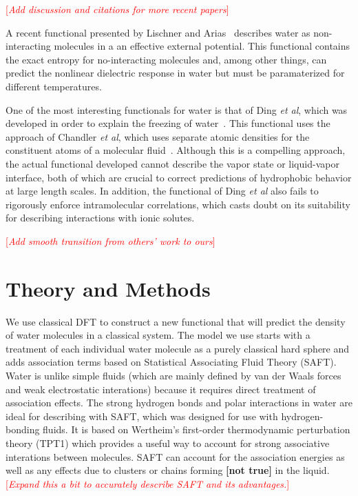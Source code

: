 \documentclass[letterpaper,twocolumn,amsmath,amssymb,prb]{revtex4-1}
\newcommand{\red}[1]{{\bf \color{red} #1}}
\newcommand{\fixme}[1]{\red{[#1]}}
\newcommand{\needsworknow}[1]{\textcolor{red}{[\emph{#1}]}}
\begin{document}
\needsworknow{Add discussion and citations for more recent papers}

A recent functional presented by Lischner and Arias~\cite{lischner2010classical}
describes water as non-interacting molecules in a an
effective external potential.  This functional contains the exact
entropy for no-interacting molecules and, among other things, can 
predict the nonlinear dielectric response in water but must be paramaterized
for different temperatures.

One of the most interesting functionals for water is that of Ding \emph{et
al}, which was developed in order to explain the freezing of
water~\cite{ding1987}.  This functional uses the approach of Chandler
\emph{et al}, which uses separate atomic densities for the constituent
atoms of a molecular fluid~\cite{chandler1986a, chandler1986b}.  Although
this is a compelling approach, the actual functional developed cannot
describe the vapor state or liquid-vapor interface, both of which are
crucial to correct predictions of hydrophobic behavior at large length
scales.  In addition, the functional of Ding \emph{et al} also fails to
rigorously enforce intramolecular correlations, which casts doubt on its
suitability for describing interactions with ionic solutes.

\needsworknow{Add smooth transition from others' work to ours}

\section{Theory and Methods}
We use classical DFT to construct a new functional that will predict
the density of water molecules in a classical system.  The model we use
starts with a treatment of each individual water molecule as a purely
classical hard sphere and adds association terms based on Statistical 
Associating Fluid Theory (SAFT). Water is unlike simple
fluids (which are mainly defined by van der Waals forces and weak electrostatic
interations) because it requires direct treatment of association effects. The strong 
hydrogen bonds and polar
interactions in water are ideal for describing with SAFT, which was designed for
use with hydrogen-bonding fluids. It is based on Wertheim's first-order
thermodynamic perturbation theory (TPT1)
\cite{wertheim1984fluidsI,wertheim1984fluidsII,wertheim1986fluidsIII,
wertheim1986fluidsIV} which provides a useful way to account for strong
associative interations between molecules. SAFT can account for the association energies
as well as any effects due to clusters or chains forming \fixme{not true}
in the liquid\cite{muller2001molecular}.  \needsworknow{Expand this a
  bit to accurately describe SAFT and its advantages.}
\end{document}
